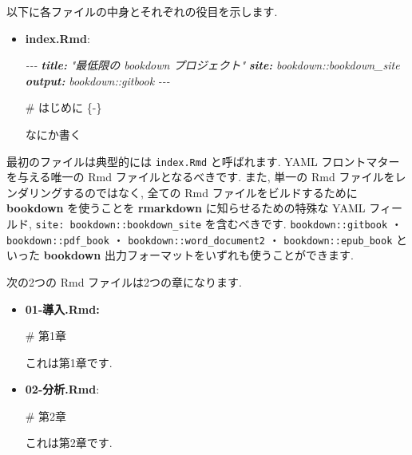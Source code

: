 \documentclass[
  11pt,
]{bxjsreport}
\newenvironment{Shaded}{\begin{snugshade}}{\end{snugshade}}
\newcommand{\AnnotationTok}[1]{\textcolor[rgb]{0.56,0.35,0.01}{\textbf{\textit{#1}}}}
\newcommand{\CommentTok}[1]{\textcolor[rgb]{0.56,0.35,0.01}{\textit{#1}}}
\newcommand{\FunctionTok}[1]{\textcolor[rgb]{0.00,0.00,0.00}{#1}}
\newcommand{\NormalTok}[1]{#1}
\begin{document}
以下に各ファイルの中身とそれぞれの役目を示します.

\begin{itemize}
\item
  \textbf{index.Rmd}:

\begin{Shaded}
\begin{Highlighting}[]
\CommentTok{{-}{-}{-}}
\AnnotationTok{title:}\CommentTok{ "最低限の bookdown プロジェクト"}
\AnnotationTok{site:}\CommentTok{ bookdown::bookdown\_site}
\AnnotationTok{output:}\CommentTok{ bookdown::gitbook}
\CommentTok{{-}{-}{-}}

\FunctionTok{\# はじめに \{{-}\}}

\NormalTok{なにか書く}
\end{Highlighting}
\end{Shaded}
\end{itemize}

最初のファイルは典型的には \texttt{index.Rmd} と呼ばれます. YAML フロントマターを与える唯一の Rmd ファイルとなるべきです. また, 単一の Rmd ファイルをレンダリングするのではなく, 全ての Rmd ファイルをビルドするために \textbf{bookdown} を使うことを \textbf{rmarkdown} に知らせるための特殊な YAML フィールド, \texttt{site: bookdown::bookdown\_site} を含むべきです. \texttt{bookdown::gitbook} ・ \texttt{bookdown::pdf\_book} ・ \texttt{bookdown::word\_document2} ・ \texttt{bookdown::epub\_book} といった \textbf{bookdown} 出力フォーマットをいずれも使うことができます.

次の2つの Rmd ファイルは2つの章になります.

\begin{itemize}
\item
  \textbf{01-導入.Rmd:}

\begin{Shaded}
\begin{Highlighting}[]
\FunctionTok{\# 第1章}

\NormalTok{これは第1章です.}
\end{Highlighting}
\end{Shaded}
\item
  \textbf{02-分析.Rmd}:

\begin{Shaded}
\begin{Highlighting}[]
\FunctionTok{\# 第2章}

\NormalTok{これは第2章です.}
\end{Highlighting}
\end{Shaded}
\end{itemize}
\end{document}

